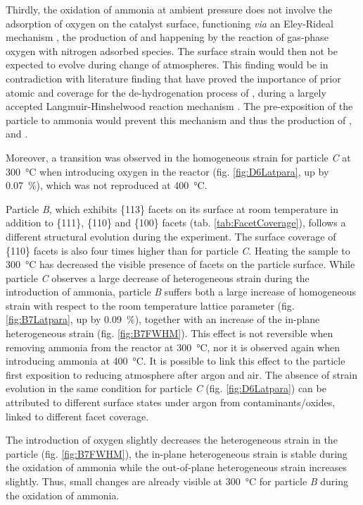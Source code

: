 Thirdly, the oxidation of ammonia at ambient pressure does not involve the adsorption of oxygen on the catalyst surface, functioning \textit{via} an Eley-Rideal mechanism \parencite{Rideal1939}, the production of  and  happening by the reaction of gas-phase oxygen with nitrogen adsorbed species.
The surface strain would then not be expected to evolve during change of atmospheres.
This finding would be in contradiction with literature finding that have proved the importance of prior atomic  and  coverage for the de-hydrogenation process of , during a largely accepted Langmuir-Hinshelwood reaction mechanism \parencite{Bradley1995, Mieher1995,vandenBroek1999, Kim2000}.
The pre-exposition of the particle to ammonia would prevent this mechanism and thus the production of ,  and .

Moreover, a transition was observed in the homogeneous strain for particle \textit{C} at \qty{300}{\degreeCelsius} when introducing oxygen in the reactor (fig. \ref{fig:D6Latpara}, up by \qty{0.07}{\percent}), which was not reproduced at \qty{400}{\degreeCelsius}.

Particle \textit{B}, which exhibits \{113\} facets on its surface at room temperature in addition to \{111\}, \{110\} and \{100\} facets (tab. \ref{tab:FacetCoverage}), follows a different structural evolution during the experiment.
The surface coverage of \{110\} facets is also four times higher than for particle \textit{C}.
Heating the sample to \qty{300}{\degreeCelsius} has decreased the visible presence of facets on the particle surface.
While particle \textit{C} observes a large decrease of heterogeneous strain during the introduction of ammonia, particle \textit{B} suffers both a large increase of homogeneous strain with respect to the room temperature lattice parameter (fig. \ref{fig:B7Latpara}, up by \qty{0.09}{\percent}), together with an increase of the in-plane heterogeneous strain (fig. \ref{fig:B7FWHM}).
This effect is not reversible when removing ammonia from the reactor at \qty{300}{\degreeCelsius}, nor it is observed again when introducing ammonia at \qty{400}{\degreeCelsius}.
It is possible to link this effect to the particle first exposition to reducing atmosphere after argon and air.
The absence of strain evolution in the same condition for particle \textit{C} (fig. \ref{fig:D6Latpara}) can be attributed to different surface states under argon from contaminants/oxides, linked to different facet coverage.

The introduction of oxygen slightly decreases the heterogeneous strain in the particle (fig. \ref{fig:B7FWHM}), the in-plane heterogeneous strain is stable during the oxidation of ammonia while the out-of-plane heterogeneous strain increases slightly.
Thus, small changes are already visible at \qty{300}{\degreeCelsius} for particle \textit{B} during the oxidation of ammonia.


